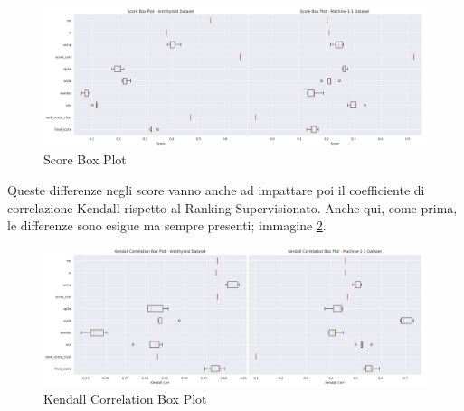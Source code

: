 \begin{figure}[t]
	\centering
	\includegraphics[width=15cm, scale=1]{images/score_box}
    \caption{Score Box Plot}
	\label{score-box}

\end{figure}

Queste differenze negli score vanno anche ad impattare poi il coefficiente di correlazione Kendall rispetto al Ranking Supervisionato. Anche qui, come prima, le differenze sono esigue ma sempre presenti; immagine \ref{kendall-box}.

\begin{figure}[t]
\centering
	\includegraphics[width=15cm, scale=1]{images/kendall_box}
    \caption{Kendall Correlation Box Plot}
	\label{kendall-box}
	
\end{figure}


